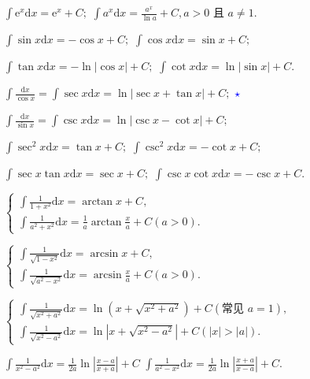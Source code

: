 \documentclass[lang=cn,math=mtpro2,10pt,scheme=chinese,black]{elegantbook}
\begin{document}
\vspace{1em}
$\displaystyle \int \mathrm{e}^x \mathrm{d}x = \mathrm{e}^x + C;$ \quad $\displaystyle \int a^x \mathrm{d}x = \frac{a^x}{\ln a} + C, a > 0 \text{ 且 } a \neq 1$.

\vspace{1em}
$\displaystyle \int \sin x \mathrm{d}x = -\cos x + C;$ \quad $\displaystyle \int \cos x \mathrm{d}x = \sin x + C;$

$\displaystyle \int \tan x \mathrm{d}x = -\ln|\cos x| + C;$ \quad $\displaystyle \int \cot x \mathrm{d}x = \ln|\sin x| + C.$

$\displaystyle \int \frac{\mathrm{d}x}{\cos x} = \int \sec x \mathrm{d}x = \ln|\sec x + \tan x| + C;$ \quad \textcolor{blue}{$\star$}

$\displaystyle \int \frac{\mathrm{d}x}{\sin x} = \int \csc x \mathrm{d}x = \ln|\csc x - \cot x| + C;$

$\displaystyle \int \sec^2 x \mathrm{d}x = \tan x + C;$ \quad $\displaystyle \int \csc^2 x \mathrm{d}x = -\cot x + C;$

$\displaystyle \int \sec x \tan x \mathrm{d}x = \sec x + C;$ \quad $\displaystyle \int \csc x \cot x \mathrm{d}x = -\csc x + C.$

\vspace{1em}
$\begin{cases}
    \displaystyle \int \frac{1}{1+x^2} \mathrm{d}x = \arctan x + C, \\
    \displaystyle \int \frac{1}{a^2 + x^2} \mathrm{d}x = \frac{1}{a} \arctan \frac{x}{a} + C (a > 0).
\end{cases}$

\vspace{1em}
$\begin{cases}
    \displaystyle \int \frac{1}{\sqrt{1-x^2}} \mathrm{d}x = \arcsin x + C, \\
    \displaystyle \int \frac{1}{\sqrt{a^2 - x^2}} \mathrm{d}x = \arcsin \frac{x}{a} + C (a > 0).
\end{cases}$

\vspace{1em}
$\begin{cases}
    \displaystyle \int \frac{1}{\sqrt{x^2 + a^2}} \mathrm{d}x = \ln(x + \sqrt{x^2 + a^2}) + C (\text{常见 } a=1), \\
    \displaystyle \int \frac{1}{\sqrt{x^2 - a^2}} \mathrm{d}x = \ln|x + \sqrt{x^2 - a^2}| + C (|x| > |a|).
\end{cases}$

$\displaystyle \int \frac{1}{x^2 - a^2} \mathrm{d}x = \frac{1}{2a} \ln \left| \frac{x-a}{x+a} \right| + C$ \qquad
$\displaystyle \int \frac{1}{a^2 - x^2} \mathrm{d}x = \frac{1}{2a} \ln \left| \frac{x+a}{x-a} \right| + C$.
\end{document}
